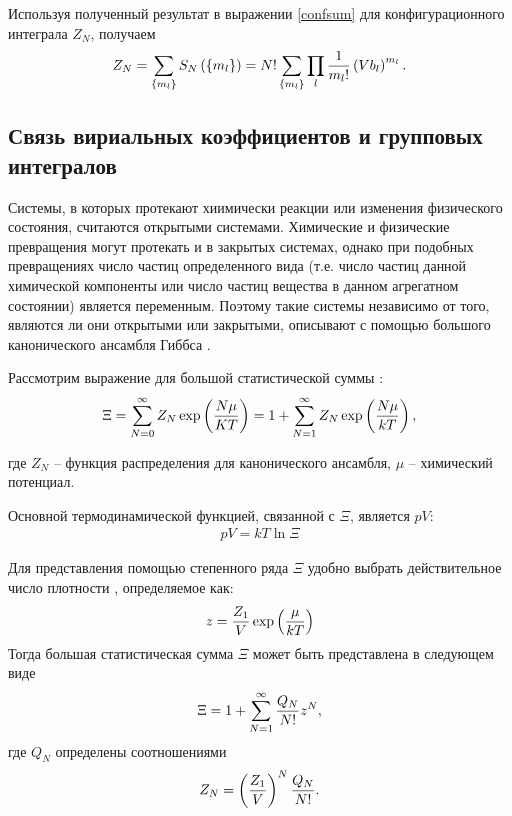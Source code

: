 Используя полученный результат в выражении \eqref{confsum} для конфигурационного интеграла $Z_N$, получаем
\vverh
\begin{gather}
	Z_N = \sum_{\left\{ m_l \right\}} S_N \left( \left\{ m_l \right\} \right) = N! \sum_{\left\{ m_l \right\}} \prod_l \frac{1}{m_l!} \left( V b_l \right)^{m_l}. \label{confsum2}
\end{gather}

\subsection{Связь вириальных коэффициентов и групповых интегралов}

Системы, в которых протекают хиимически реакции или изменения физического состояния, считаются открытыми системами. Химические и физические превращения могут протекать и в закрытых системах, однако при подобных превращениях число частиц определенного вида (т.е. число частиц данной химической компоненты или число частиц вещества в данном агрегатном состоянии) является переменным. Поэтому такие системы независимо от того, являются ли они открытыми или закрытыми, описывают с помощью большого канонического ансамбля Гиббса \cite{hirsch}. \par 
Рассмотрим выражение для большой статистической суммы \cite{meyson}:
\vverh
\begin{gather}
	\Xi = \sum_{N=0}^\infty Z_N \exp \left( \frac{N \mu}{K T} \right) = 1 + \sum_{N=1}^\infty Z_N \exp \left( \frac{N \mu}{k T} \right), \notag 
\end{gather}

где $Z_N$ -- функция распределения для канонического ансамбля, $\mu$ -- химический потенциал. \par
Основной термодинамической функцией, связанной с $\Xi$, является $pV$:
\vverh
\begin{gather}
	p V = kT \ln \Xi \label{pvfromxi}
\end{gather}

Для представления помощью степенного ряда  $\Xi$ удобно выбрать действительное число плотности \cite{rowlin1964}, определяемое как:
\vverh
\begin{gather}
	z = \frac{Z_1}{V} \exp \left( \frac{\mu}{k T} \right) \notag
\end{gather}
Тогда большая статистическая сумма $\Xi$ может быть представлена в следующем виде
\vverh
\begin{gather}
	\Xi = 1 + \sum_{N=1}^\infty \frac{Q_N}{N!} z^N, \notag
\end{gather}
где $Q_N$ определены соотношениями
\vverh
\begin{gather}
	Z_N = \left( \frac{Z_1}{V} \right)^N \frac{Q_N}{N!} . \notag
\end{gather}

